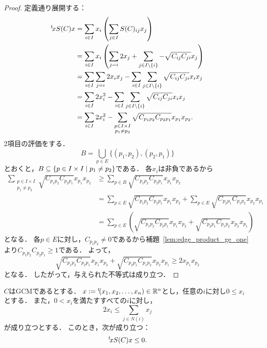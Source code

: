 \begin{proof}
  定義通り展開する：
  \begin{align}
    {}^t\!x S(C) x
    &= \sum_{i \in I} x_i \left( \sum_{j \in I} S(C)_{ij} x_j \right) \\
    &= \sum_{i \in I} x_i \left( \sum_{j = i} 2 x_j + \sum_{j \in I \setminus \{i\}} -\sqrt{C_{ij} C_{ji}} x_j \right) \\
    &= \sum_{i \in I} \sum_{j = i} 2 x_i x_j - \sum_{i \in I} \sum_{j \in I \setminus \{i\}} \sqrt{C_{ij} C_{ji}} x_i x_j \\
    &= \sum_{i \in I} 2 x_i ^ 2 - \sum_{i \in I} \sum_{j \in I \setminus \{i\}} \sqrt{C_{ij} C_{ji}} x_i x_j \\
    &= \sum_{i \in I} 2 x_i ^ 2 - \sum_{\substack{p \in I \times I \\ p_1 \ne p_2}} \sqrt{C_{p_1 p_2} C_{p_2 p_1}} x_{p_1} x_{p_2}.
  \end{align}
  2項目の評価をする．
  \begin{equation}
    B = \bigcup_{p \in E} \{(p_1, p_2), (p_2, p_1)\}
  \end{equation}
  とおくと，$B \subseteq \left\lbrace p \in I \times I \mathrel{} \middle| \mathrel{} p_1 \ne p_2 \right\rbrace$である．
  各$x_i$は非負であるから
  \begin{align}
    \sum_{\substack{p \in I \times I \\ p_1 \ne p_2}} \sqrt{C_{p_1 p_2} C_{p_2 p_1}} x_{p_1} x_{p_2}
    &\ge \sum_{p \in B} \sqrt{C_{p_1 p_2} C_{p_2 p_1}} x_{p_1} x_{p_2} \\
    &= \sum_{p \in E} \sqrt{C_{p_1 p_2} C_{p_2 p_1}} x_{p_1} x_{p_2} + \sum_{p \in E} \sqrt{C_{p_2 p_1} C_{p_1 p_2}} x_{p_2} x_{p_1} \\
    &= \sum_{p \in E} (\sqrt{C_{p_1 p_2} C_{p_2 p_1}} x_{p_1} x_{p_2} + \sqrt{C_{p_2 p_1} C_{p_1 p_2}} x_{p_2} x_{p_1})
  \end{align}
  となる．
  各$p \in E$に対し，$C_{p_1 p_2} \ne 0$であるから補題~\ref{lem:edge_product_ge_one}より$C_{p_1 p_2} C_{p_2 p_1} \ge 1$である．
  よって，
  \begin{equation}
    \sqrt{C_{p_1 p_2} C_{p_2 p_1}} x_{p_1} x_{p_2} + \sqrt{C_{p_2 p_1} C_{p_1 p_2}} x_{p_2} x_{p_1}
    \ge 2 x_{p_1} x_{p_2}
  \end{equation}
  となる．
  したがって，与えられた不等式は成り立つ．
\end{proof}

\begin{lemma}
  \label{lem:quadform_nonpos_of_neighbor_bound}
  \leanok
  $C$はGCMであるとする．
  $x := {}^t\!(x_1, x_2, \ldots, x_n) \in \mathbb{R}^n$とし，任意の$i$に対し$0 \le x_i$とする．
  また，$0 < x_i$を満たすすべての$i$に対し，
  \begin{equation}
    2 x_i
    \le \sum_{j \in N(i)} x_j
  \end{equation}
  が成り立つとする．
  このとき，次が成り立つ：
  \begin{equation}
    {}^t\!x S(C) x \le 0.
  \end{equation}
\end{lemma}

